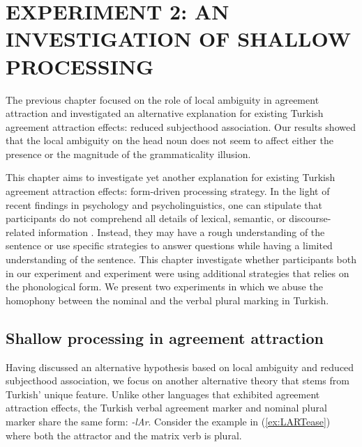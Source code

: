 \chapter{EXPERIMENT 2: AN INVESTIGATION OF SHALLOW PROCESSING} \label{ch:exp2}

The previous chapter focused on the role of local ambiguity in agreement attraction and investigated an alternative explanation for existing Turkish agreement attraction effects: reduced subjecthood association. Our results showed that the local ambiguity on the head noun does not seem to affect either the presence or the magnitude of the grammaticality illusion.

This chapter aims to investigate yet another explanation for existing Turkish agreement attraction effects: form-driven processing strategy. In the light of recent findings in psychology and psycholinguistics, one can stipulate that participants do not comprehend all details of lexical, semantic, or discourse-related information \citep{ChristiansonEtAl2001}. Instead, they may have a rough understanding of the sentence or use specific strategies to answer questions while having a limited understanding of the sentence. This chapter investigate whether participants both in our experiment and \cites{LagoEtAl2015} experiment were using additional strategies that relies on the phonological form. We present two experiments in which we abuse the homophony between the nominal and the verbal plural marking in Turkish. 

\section{Shallow processing in agreement attraction}

Having discussed an alternative hypothesis based on local ambiguity and reduced subjecthood association, we focus on another alternative theory that stems from Turkish' unique feature. Unlike other languages that exhibited agreement attraction effects, the Turkish verbal agreement marker and nominal plural marker share the same form: \emph{-lAr}. Consider the example in (\ref{ex:LARTease}) where both the attractor and the matrix verb is plural. 

\z


